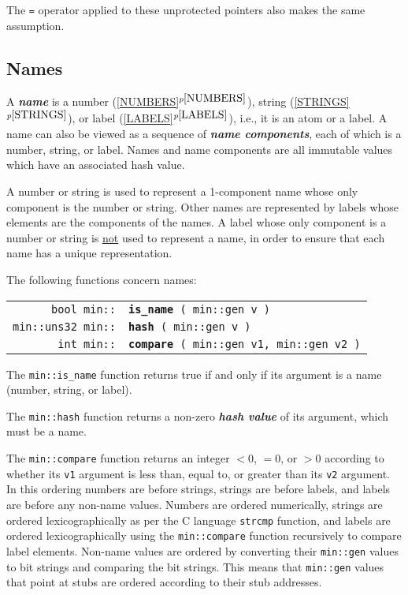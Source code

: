 \documentclass[12pt]{article}
\makeatletter
\newcommand{\key}[1]{{\bf \em #1}\index{#1}}
\newcommand{\skey}[2]{{\bf \em #1#2}\index{#1}}
\newcommand{\ttindex}[1]{\index{#1@{\tt #1}}}
\newcommand{\minindex}[1]{\ttindex{min::#1}\ttindex{#1}}
\newcommand{\itemref}[1]{\ref{#1}$^{p\pageref{#1}}$}
\newcommand{\EOL}{\penalty \exhyphenpenalty}
\newenvironment{indpar}[1][0.3in]%
	{\begin{list}{}%
		     {\setlength{\itemsep}{0in}%
		      \setlength{\topsep}{0in}%
		      \setlength{\parsep}{1ex}%
		      \setlength{\labelwidth}{#1}%
		      \setlength{\leftmargin}{#1}%
		      \addtolength{\leftmargin}{\labelsep}}%
	 \item}%
	{\end{list}}
\newcommand{\LABEL}[1]{\label{#1}}
\newcommand{\MINKEY}[1]{{\tt \bf #1}\minindex{#1}}
\makeatother
\begin{document}
The {\tt =} operator applied to these unprotected
pointers also makes the same assumption.

\subsection{Names}
\label{NAMES}

A \key{name} is a
number (\itemref{NUMBERS}),
string (\itemref{STRINGS}),
or label (\itemref{LABELS}), i.e., it is an atom or a label.
A name can also be viewed as
a sequence of \skey{name component}s, each of which is a number, string,
or label.
Names and name components are all immutable values which have an associated
hash value.

A number or string is used to represent a 1-component name whose
only component is the number or string.  Other names are represented
by labels whose elements are the components of the names.  A label whose
only component is a number or string is \underline{not}
used to represent a name, in order to ensure that each name has a unique
representation.

The following functions concern names:

\begin{indpar}\begin{tabular}{r@{}l}
\verb|bool min::| & \MINKEY{is\_name}\verb| ( min::gen v )|
\LABEL{MIN::IS_NAME} \\
\verb|min::uns32 min::| & \MINKEY{hash}\verb| ( min::gen v )|
\LABEL{MIN::HASH} \\
\verb|int min::| & \MINKEY{compare}\verb| ( min::gen v1, min::gen v2 )|
\LABEL{MIN::COMPARE} \\
\end{tabular}\end{indpar}

The \verb|min::is_name| function returns true if and only if its argument is
a name (number, string, or label).

The \verb|min::hash| function returns a non-zero
\key{hash value}\label{HASH-VALUE} of its argument, which must be
a name.

The \verb|min::compare| function returns an integer $<0$, $=0$, or $>0$
according to whether its \verb|v1| argument is less than, equal to, or
greater than its \verb|v2| argument.
In this ordering numbers are
before strings, strings are before labels, and labels are before
any non-name values.  Numbers are ordered
numerically, strings are ordered lexicographically as per the
C language \verb|strcmp| function, and labels are ordered lexicographically
using the {\tt min::\EOL compare} function recursively to compare
label elements.  Non-name values are ordered by converting their
\verb|min::gen| values to bit strings and comparing the bit strings.
This means that \verb|min::gen| values that point at stubs are ordered
according to their stub addresses.
\end{document}
